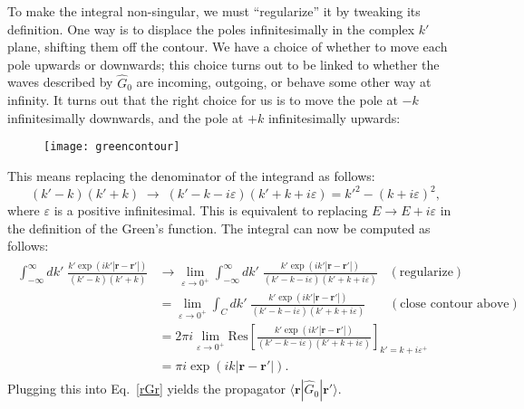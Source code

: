\documentclass[pra,12pt]{revtex4}
\begin{document}
To make the integral non-singular, we must ``regularize'' it by
tweaking its definition.  One way is to displace the poles
infinitesimally in the complex $k'$ plane, shifting them off the
contour.  We have a choice of whether to move each pole upwards or
downwards; this choice turns out to be linked to whether the waves
described by $\hat{G}_0$ are incoming, outgoing, or behave some other
way at infinity.  It turns out that the right choice for us is to move
the pole at $-k$ infinitesimally downwards, and the pole at $+k$
infinitesimally upwards:

\begin{figure}[h!]
  \centering\texttt{[image: greencontour]}
\end{figure}

\noindent
This means replacing the denominator of the integrand as
follows:
\begin{equation}
  (k' - k)(k'+k) \;\rightarrow\; (k' - k - i\varepsilon)(k'+k+i\varepsilon) = {k'}^2 - (k+i\varepsilon)^2,
\end{equation}
where $\varepsilon$ is a positive infinitesimal.  This is equivalent
to replacing $E \rightarrow E + i\varepsilon$ in the definition of the
Green's function.  The integral can now be computed as
follows:
\begin{align*}
  \begin{aligned}\int_{-\infty}^\infty dk' \; \frac{\displaystyle k' \exp\left(ik'|\mathbf{r}-\mathbf{r}'|\right)}{(k' - k)(k'+k)} &\rightarrow \lim_{\varepsilon \rightarrow 0^+} \int_{-\infty}^\infty dk' \; \frac{\displaystyle k' \exp\left(ik'|\mathbf{r}-\mathbf{r}'|\right)}{(k' - k - i\varepsilon)(k'+k+i\varepsilon)}\;\;\; (\text{regularize}) \\ &= \lim_{\varepsilon \rightarrow 0^+} \int_C dk' \; \frac{\displaystyle k' \exp\left(ik'|\mathbf{r}-\mathbf{r}'|\right)}{(k' - k - i\varepsilon)(k'+k+i\varepsilon)} \quad\;\;\; (\text{close contour above}) \\ &= 2\pi i \lim_{\varepsilon \rightarrow 0^+} \mathrm{Res}\left[\frac{\displaystyle k' \exp\left(ik'|\mathbf{r}-\mathbf{r}'|\right)}{(k' - k - i\varepsilon)(k'+k+i\varepsilon)}\right]_{k'=k+i\varepsilon^+} \\ &= \pi i \exp\left(ik|\mathbf{r}-\mathbf{r}'|\right).\end{aligned}
\end{align*}
Plugging this into Eq.~\eqref{rGr} yields the propagator
$\langle\mathbf{r}|\hat{G}_0|\mathbf{r}'\rangle$.  
\end{document}
